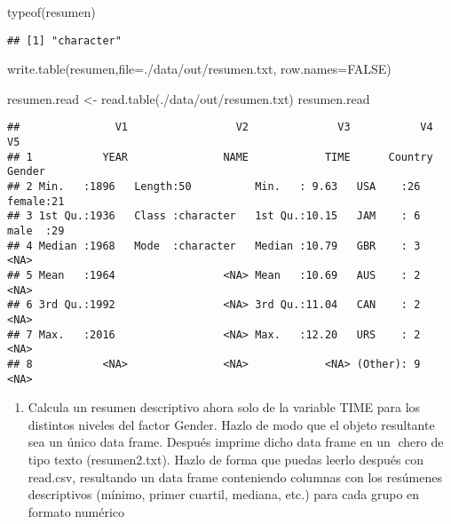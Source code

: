 \documentclass[
]{article}
\newenvironment{Shaded}{\begin{snugshade}}{\end{snugshade}}
\newcommand{\AttributeTok}[1]{\textcolor[rgb]{0.77,0.63,0.00}{#1}}
\newcommand{\ConstantTok}[1]{\textcolor[rgb]{0.00,0.00,0.00}{#1}}
\newcommand{\FunctionTok}[1]{\textcolor[rgb]{0.00,0.00,0.00}{#1}}
\newcommand{\NormalTok}[1]{#1}
\newcommand{\OtherTok}[1]{\textcolor[rgb]{0.56,0.35,0.01}{#1}}
\newcommand{\StringTok}[1]{\textcolor[rgb]{0.31,0.60,0.02}{#1}}
\providecommand{\tightlist}{%
  \setlength{\itemsep}{0pt}\setlength{\parskip}{0pt}}
\begin{document}
\begin{Shaded}
\begin{Highlighting}[]
\FunctionTok{typeof}\NormalTok{(resumen)}
\end{Highlighting}
\end{Shaded}

\begin{verbatim}
## [1] "character"
\end{verbatim}

\begin{Shaded}
\begin{Highlighting}[]
\FunctionTok{write.table}\NormalTok{(resumen,}\AttributeTok{file=}\StringTok{\textquotesingle{}./data/out/resumen.txt\textquotesingle{}}\NormalTok{, }\AttributeTok{row.names=}\ConstantTok{FALSE}\NormalTok{)}
\end{Highlighting}
\end{Shaded}

\begin{Shaded}
\begin{Highlighting}[]
\NormalTok{resumen.read }\OtherTok{\textless{}{-}} \FunctionTok{read.table}\NormalTok{(}\StringTok{\textquotesingle{}./data/out/resumen.txt\textquotesingle{}}\NormalTok{)}
\NormalTok{resumen.read}
\end{Highlighting}
\end{Shaded}

\begin{verbatim}
##               V1                 V2              V3           V4          V5
## 1           YEAR               NAME            TIME      Country      Gender
## 2 Min.   :1896   Length:50          Min.   : 9.63   USA    :26   female:21  
## 3 1st Qu.:1936   Class :character   1st Qu.:10.15   JAM    : 6   male  :29  
## 4 Median :1968   Mode  :character   Median :10.79   GBR    : 3          <NA>
## 5 Mean   :1964                 <NA> Mean   :10.69   AUS    : 2          <NA>
## 6 3rd Qu.:1992                 <NA> 3rd Qu.:11.04   CAN    : 2          <NA>
## 7 Max.   :2016                 <NA> Max.   :12.20   URS    : 2          <NA>
## 8           <NA>               <NA>            <NA> (Other): 9          <NA>
\end{verbatim}

\begin{enumerate}
\def\labelenumi{\arabic{enumi}.}
\setcounter{enumi}{3}
\tightlist
\item
  Calcula un resumen descriptivo ahora solo de la variable TIME para los
  distintos niveles del factor Gender. Hazlo de modo que el objeto
  resultante sea un único data frame. Después imprime dicho data frame
  en un chero de tipo texto (resumen2.txt). Hazlo de forma que puedas
  leerlo después con read.csv, resultando un data frame conteniendo
  columnas con los resúmenes descriptivos (mínimo, primer cuartil,
  mediana, etc.) para cada grupo en formato numérico
\end{enumerate}
\end{document}
